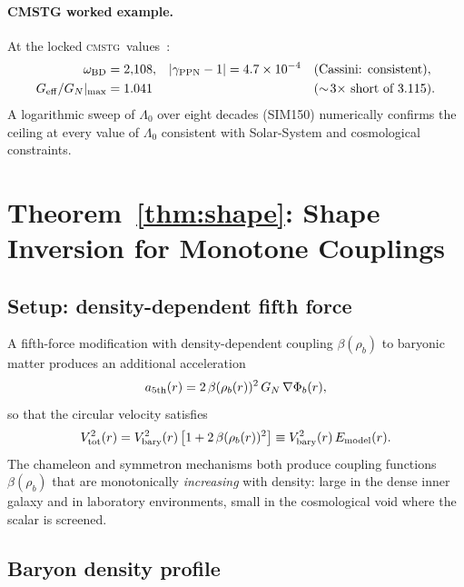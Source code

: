 \documentclass[12pt,a4paper]{article}
\theoremstyle{plain}
\newcommand{\Geff}{G_{\rm eff}}
\newcommand{\GN}{G_N}
\newcommand{\obd}{\omega_{\rm BD}}
\newcommand{\rhob}{\rho_b}
\newcommand{\Vbary}{V_{\rm bary}}
\newcommand{\CMSTG}{\textsc{cmstg}}
\begin{document}
\paragraph{CMSTG worked example.}
At the locked \CMSTG\ values~\cite{WilsonPaperIV}:
\begin{align}
  \obd &= 2{,}108, & |\gamma_{\rm PPN}-1| &= 4.7\times10^{-4}
  && \text{(Cassini: consistent)},\nonumber\\
  \Geff/\GN|_{\rm max} &= 1.041
  && && \text{($\sim\!3\times$ short of 3.115)}.
\end{align}
A logarithmic sweep of $\Lambda_0$ over eight decades (SIM150)
numerically confirms the ceiling at every value of $\Lambda_0$ consistent
with Solar-System and cosmological constraints.

\section{Theorem~\ref{thm:shape}: Shape Inversion for Monotone Couplings}
\label{sec:shape}

\subsection{Setup: density-dependent fifth force}
\label{sec:shape_setup}

A fifth-force modification with density-dependent coupling $\beta(\rhob)$
to baryonic matter produces an additional acceleration~\cite{KhouryWeltman2004a,
KhouryWeltman2004b,HinterbichlerKhoury2010}
\begin{equation}
  a_{\rm 5th}(r) = 2\,\beta(\rhob(r))^2\,\GN\,\nabla\Phi_b(r),
  \label{eq:5thforce}
\end{equation}
so that the circular velocity satisfies
\begin{equation}
  V_{\rm tot}^2(r) = \Vbary^2(r)\,\bigl[1 + 2\,\beta(\rhob(r))^2\bigr]
    \equiv \Vbary^2(r)\,E_{\rm model}(r).
  \label{eq:vtot}
\end{equation}
The chameleon and symmetron mechanisms both produce coupling functions
$\beta(\rhob)$ that are monotonically \emph{increasing} with density:
large in the dense inner galaxy and in laboratory environments, small in
the cosmological void where the scalar is screened.

\subsection{Baryon density profile}
\label{sec:shape_density}
\end{document}
